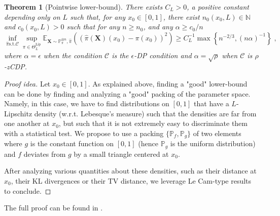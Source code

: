 \documentclass[10pt]{article} %
\newtheorem{theorem}{Theorem}
\newcommand{\N}[0]{\mathbb{N}}
\newcommand{\Prob}[0]{\mathbb{P}}
\newcommand{\E}[0]{\mathbb{E}}
\newcommand\vect[1]{\mathbf{#1}}
\newcommand\p[1]{\left( {#1}\right)}
\newcommand\RG[1]{\textcolor{red}{#1}}
\newcommand\mRG[1]{\marginpar{\tiny\RG{#1}}}
\newcommand\AG[1]{\textcolor{magenta}{#1}}
\newcommand\CL[1]{\textcolor{blue}{#1}}
\begin{document}
\begin{theorem}[Pointwise lower-bound]
\label{th:lpdp}
There exists $C_L>0$, %
a positive constant depending only on $L$ such that, for any $x_0 \in [0, 1]$, there exist $n_0(x_0, L) \in \N$ and $c_0(x_0, L) > 0$ such that for any $n \geq n_0$, and any $\alpha \geq c_0/n$
\begin{equation}
\label{eq:deftriangle}
    \inf_{\hat{\pi} \mathrm{ s.t. } \mathcal{C}} \sup_{\pi \in \Theta^{\mathrm{Lip}}_L}
    \E_{\vect{X} \sim \Prob_{\pi}^{\otimes n}, \hat{\pi}}\p{\p{\hat{\pi}(\vect{X})(x_0) - \pi(x_0)}^2} \geq C_L^{-1} \max \left\{ n^{-2/3}, (n\alpha)^{-1} \right\}
    \;,
\end{equation}
where $\alpha = \epsilon$ when the condition $\mathcal{C}$ is the $\epsilon$-DP condition and $\alpha = \sqrt{\rho}$ when %
$\mathcal{C}$ is $\rho$-zCDP.
\end{theorem}
\begin{proof}[Proof idea] %
Let $x_0 \in [0, 1]$.
As explained above, finding a "good" lower-bound can be done by finding and analyzing a "good" packing of the parameter space. Namely, in this case, we have to find distributions on $[0, 1]$ that have a $L$-Lipschitz density (w.r.t. Lebesque's measure) such that the densities are far from one another at $x_0$, but such that it is not extremely easy to discriminate them with a statistical test.
We propose to use a packing $\{ \Prob_f, \Prob_g\}$ of two elements where $g$ is the constant function on $[0, 1]$ (hence $\Prob_g$ is the uniform distribution) and $f$ deviates from $g$ by a small triangle centered at $x_0$. 

After analyzing various quantities about these densities, such as their distance at $x_0$, their KL divergences or their TV distance, we leverage Le Cam-type results to conclude.
\end{proof}
The full proof can be found in .

\end{document}
